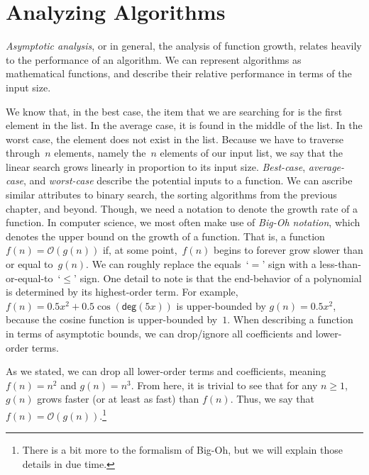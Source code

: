 \section{Analyzing Algorithms}

\emph{Asymptotic analysis}, or in general, the analysis of function growth, relates heavily to the performance of an algorithm. 
We can represent algorithms as mathematical functions, and describe their relative performance in terms of the input size. 

We know that, in the best case, the item that we are searching for is the first element in the list. 
In the average case, it is found in the middle of the list. In the worst case, the element does not exist in the list. 
Because we have to traverse through~$n$ elements, namely the~$n$ elements of our input list, we say that the linear search grows linearly in proportion to its input size. \emph{Best-case}, \emph{average-case}, and \emph{worst-case} describe the potential inputs to a function. 
We can ascribe similar attributes to binary search, the sorting algorithms from the previous chapter, and beyond. 
Though, we need a notation to denote the growth rate of a function. 
In computer science, we most often make use of \emph{Big-Oh notation}, which denotes the upper bound on the growth of a function. 
That is, a function $f(n) = \mathcal{O}(g(n))$ if, at some point,~$f(n)$ begins to forever grow slower than or equal to~$g(n)$. 
We can roughly replace the equals~`$=$' sign with a less-than-or-equal-to~`$\leq$' sign. 
One detail to note is that the end-behavior of a polynomial is determined by its highest-order term. 
For example, $f(n) = 0.5x^2 + 0.5\cos(\textsf{deg}(5x))$ is upper-bounded by $g(n) = 0.5x^2$, because the cosine function is upper-bounded by~$1$. 
When describing a function in terms of asymptotic bounds, we can drop/ignore all coefficients and lower-order terms.

As we stated, we can drop all lower-order terms and coefficients, meaning $f(n) = n^2$ and $g(n) = n^3$. 
From here, it is trivial to see that for any $n \geq 1$, $g(n)$ grows faster (or at least as fast) than $f(n)$.
Thus, we say that $f(n) = \mathcal{O}(g(n))$.\footnote{There is a bit more to the formalism of Big-Oh, but we will explain those details in due time.}


